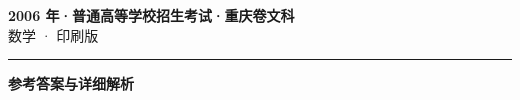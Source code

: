 \documentclass[zihao=5, a4paper]{ctexart}
\begin{document}
\begin{center}
  {\Large\bfseries 2006 年·普通高等学校招生考试·重庆卷文科}\\[4pt]
  {\large 数学 · 印刷版}
\end{center}
\medskip
{}

\par\bigskip\hrule\bigskip
{}
\begin{center}{\large\bfseries 参考答案与详细解析}\end{center}
\smallskip

\end{document}
